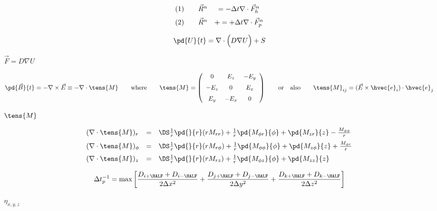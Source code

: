 \documentclass{article}
\begin{document}
\[
  \begin{array}{llc}
    (1)\quad & \vec{R}^{n} &  =  - \Delta t\nabla\cdot\vec{F}_h^n
    \\ \noalign{\medskip}
    (2)\quad & \vec{R}^{n} & +=  + \Delta t\nabla\cdot\vec{F}_p^n
  \end{array}
\]
\pagebreak

\[
  \pd{U}{t} = \nabla\cdot\Big(D\nabla U\Big) + S
\]
\pagebreak

$\vec{F} = D\nabla U$
\pagebreak

\[
  \pd{\vec{B}}{t} = - \nabla\times\vec{E} \equiv -\nabla\cdot\tens{M}
  \qquad\mathrm{where}\qquad
  \tens{M} = \left(\begin{array}{ccc}
      0    &  E_z  & -E_y  \\ \noalign{\medskip}
     -E_z  &  0    &  E_x  \\ \noalign{\medskip}
      E_y  & -E_x  & 0
  \end{array}\right) \qquad\mathrm{or\quad also}\qquad
  \tens{M}_{ij} = (\vec{E}\times\hvec{e}_i)\cdot\hvec{e}_j
\]
\pagebreak

$\tens{M}$
\pagebreak

\[
   \begin{array}{lcl}
   (\nabla\cdot\tens{M})_r &=&\DS
                                 \frac{1}{r}\pd{}{r}(rM_{rr})
                               + \frac{1}{r}\pd{M_{\phi r}}{\phi}
                               +            \pd{M_{zr}}{z}
                               - \frac{M_{\phi\phi}}{r}
   \\ \noalign{\medskip}
   (\nabla\cdot\tens{M})_\phi &=&\DS
                                 \frac{1}{r}\pd{}{r}(rM_{r\phi})
                               + \frac{1}{r}\pd{M_{\phi\phi}}{\phi}
                               +            \pd{M_{z\phi}}{z}
                               + \frac{M_{\phi r}}{r}
   \\ \noalign{\medskip}
   (\nabla\cdot\tens{M})_z &=&\DS
                                 \frac{1}{r}\pd{}{r}(rM_{rz})
                               + \frac{1}{r}\pd{M_{\phi z}}{\phi}
                               +            \pd{M_{zz}}{z}
   \end{array}
\]
\pagebreak

\[ \Delta t_{p}^{-1} = 
    \max\left[\frac{D_{i+\HALF} + D_{i-\HALF}}{2\Delta x^2} +
              \frac{D_{j+\HALF} + D_{j-\HALF}}{2\Delta y^2} +
              \frac{D_{k+\HALF} + D_{k-\HALF}}{2\Delta z^2}\right]
\]
\pagebreak

$\eta_{x,y,z}$
\pagebreak
\end{document}

